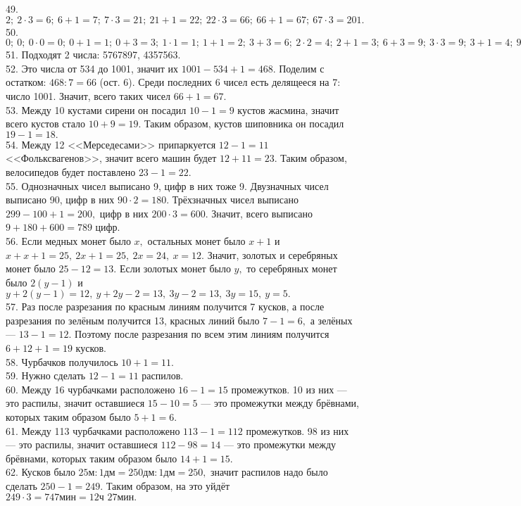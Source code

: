 49. $2;\ 2\cdot3=6;\ 6+1=7;\ 7\cdot3=21;\ 21+1=22;\ 22\cdot3=66;\ 66+1=67;\ 67\cdot3=201.$\\
50. $0;\ 0;\ 0\cdot0=0;\ 0+1=1;\ 0+3=3;\ 1\cdot1=1;\ 1+1=2;\ 3+3=6;\ 2\cdot2=4;\ 2+1=3;\ 6+3=9;\ 3\cdot3=9;\ 3+1=4;\ 9+3=12;\ 4\cdot4=16;\ 4+1=5;\ 12+3=15;\ 5\cdot5=25.$\\
51. Подходят 2 числа: 5767897, 4357563.\\
52. Это числа от 534 до 1001, значит их $1001-534+1=468.$ Поделим с остатком: $468:7=66$ (ост. 6). Среди последних 6 чисел есть делящееся на 7: число 1001. Значит, всего таких чисел $66+1=67.$\\
53. Между 10 кустами сирени он посадил $10-1=9$ кустов жасмина, значит всего кустов стало $10+9=19.$ Таким образом, кустов шиповника он посадил $19-1=18.$\\
54. Между 12 <<Мерседесами>> припаркуется $12-1=11$ <<Фольксвагенов>>, значит всего машин будет $12+11=23.$ Таким образом, велосипедов будет поставлено $23-1=22.$\\
55. Однозначных чисел выписано 9, цифр в них тоже 9. Двузначных чисел выписано 90, цифр в них $90\cdot2=180.$ Трёхзначных чисел выписано $299-100+1=200,$ цифр в них $200\cdot3=600.$ Значит, всего выписано $9+180+600=789$ цифр.\\
56. Если медных монет было $x,$ остальных монет было $x+1$ и $x+x+1=25,\ 2x+1=25,\ 2x=24,\ x=12.$ Значит, золотых и серебряных монет было $25-12=13.$ Если золотых монет было $y,$ то серебряных монет было $2(y-1)$ и $y+2(y-1)=12,\ y+2y-2=13,\ 3y-2=13,\ 3y=15,\ y=5.$\\
57. Раз после разрезания по красным линиям получится 7 кусков, а после разрезания по зелёным получится 13, красных линий было $7-1=6,$ а зелёных --- $13-1=12.$ Поэтому после разрезания по всем этим линиям получится $6+12+1=19$ кусков.\\
58. Чурбачков получилось $10+1=11.$\\
59. Нужно сделать $12-1=11$ распилов.\\
60. Между 16 чурбачками расположено $16-1=15$ промежутков. 10 из них --- это распилы, значит оставшиеся $15-10=5$ --- это промежутки между брёвнами, которых таким образом было $5+1=6.$\\
61. Между 113 чурбачками расположено $113-1=112$ промежутков. 98 из них --- это распилы, значит оставшиеся $112-98=14$ --- это промежутки между брёвнами, которых таким образом было $14+1=15.$\\
62. Кусков было $25\text{м}:1\text{дм}=250\text{дм}:1\text{дм}=250,$ значит распилов надо было сделать $250-1=249.$ Таким образом, на это уйдёт $249\cdot3=747\text{мин}=12\text{ч }27\text{мин}.$\\
